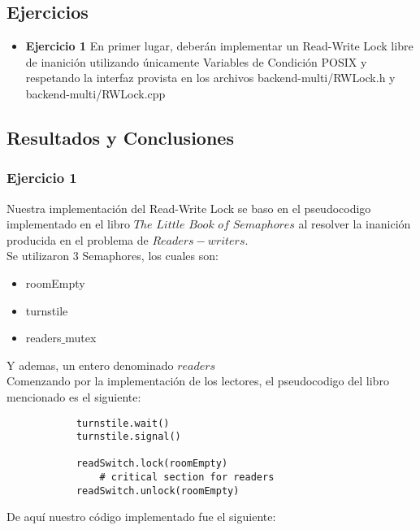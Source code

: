 
\subsection{Ejercicios}
\begin{itemize}
 \item \textbf{Ejercicio 1 }
 En primer lugar, deberán implementar un Read-Write Lock libre de inanición utilizando únicamente Variables de Condición POSIX 
 y  respetando la interfaz provista en los archivos backend-multi/RWLock.h y backend-multi/RWLock.cpp
\end{itemize}

\subsection{Resultados y Conclusiones}

\subsubsection[Resolución Ejercicio 1]{Ejercicio 1}

\indent Nuestra implementación del Read-Write Lock se baso en el pseudocodigo implementado en el libro $The$ $Little$ $Book$ $of$ $Semaphores$
al resolver la inanición producida en el problema de $Readers-writers$.\\

Se utilizaron 3 Semaphores, los cuales son:\\
\begin{itemize}
 \item roomEmpty
 \item turnstile
 \item readers$\_$mutex
\end{itemize}

Y ademas, un entero denominado $readers$\\

Comenzando por la implementación de los lectores, el pseudocodigo del libro mencionado es el siguiente:\\

\begin{verbatim}
            turnstile.wait()
            turnstile.signal()

            readSwitch.lock(roomEmpty)
                # critical section for readers
            readSwitch.unlock(roomEmpty)
\end{verbatim}

De aquí nuestro código implementado fue el siguiente:\\

